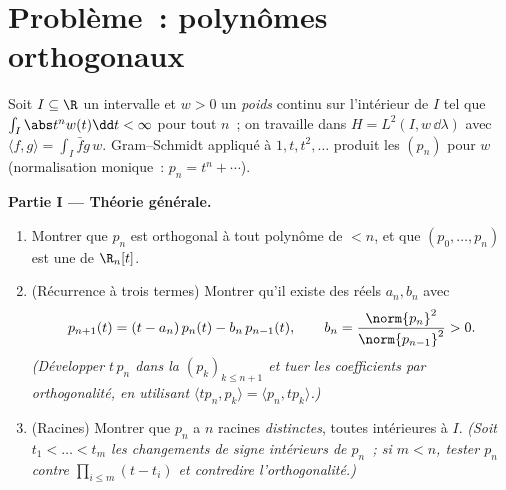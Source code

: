 \section{Problème~: polynômes orthogonaux}

\begin{problem}\label{pb:b3:hilbert:1}
Soit $I \subseteq \R$ un intervalle et $w > 0$ un
\emph{poids} continu sur l'intérieur de $I$ tel que $\int_I
\abs t^nw(t)\dd t < \infty$ pour tout $n$~; on travaille dans
$H = L^2(I, w\,\dd\lambda)$ avec $\langle f, g\rangle =
\int_I \bar fg\,w$. Gram--Schmidt appliqué à $1, t, t^2,
\dots$ produit les \emph{} $(p_n)$ pour
$w$ (normalisation monique~: $p_n = t^n + \cdots$).

\medskip
\noindent\textbf{Partie I --- Théorie générale.}
\begin{enumerate}
  \item Montrer que $p_n$ est orthogonal à tout polynôme de
         $< n$, et que $(p_0, \dots, p_n)$ est une 
        de $\R_n[t]$.
  \item (Récurrence à trois termes) Montrer qu'il existe des
        réels $a_n, b_n$ avec
        \[
        p_{n+1}(t) = (t - a_n)\,p_n(t) - b_n\,p_{n-1}(t),
        \qquad b_n = \frac{\norm{p_n}^2}{\norm{p_{n-1}}^2} >
        0 .
        \]
        \emph{(Développer $t\,p_n$ dans la  $(p_k)_{k \leq
        n+1}$ et tuer les coefficients par orthogonalité, en
        utilisant $\langle tp_n, p_k\rangle = \langle p_n,
        tp_k\rangle$.)}
  \item (Racines) Montrer que $p_n$ a $n$ racines
        \emph{distinctes}, toutes intérieures à $I$.
        \emph{(Soit $t_1 < \dots < t_m$ les changements de
        signe intérieurs de $p_n$~; si $m < n$, tester $p_n$
        contre $\prod_{i\leq m}(t - t_i)$ et contredire
        l'orthogonalité.)}
\end{enumerate}


\end{problem}
